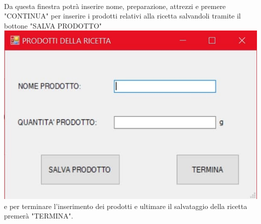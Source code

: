 \documentclass[a4paper, titlepage]{article}
\begin{document}
\begin{itemize}
    \\Da questa finestra potrà inserire nome, preparazione, attrezzi e premere "CONTINUA" per inserire i prodotti relativi alla ricetta salvandoli tramite il bottone "SALVA PRODOTTO"\\
    \includegraphics[scale=0.30]{Immagini/form/Form AggiungiProdottiRicetta.jpg}
    \\e per terminare l'inserimento dei prodotti e ultimare il salvataggio della ricetta premerà "TERMINA".
\end{itemize}
\end{document}
